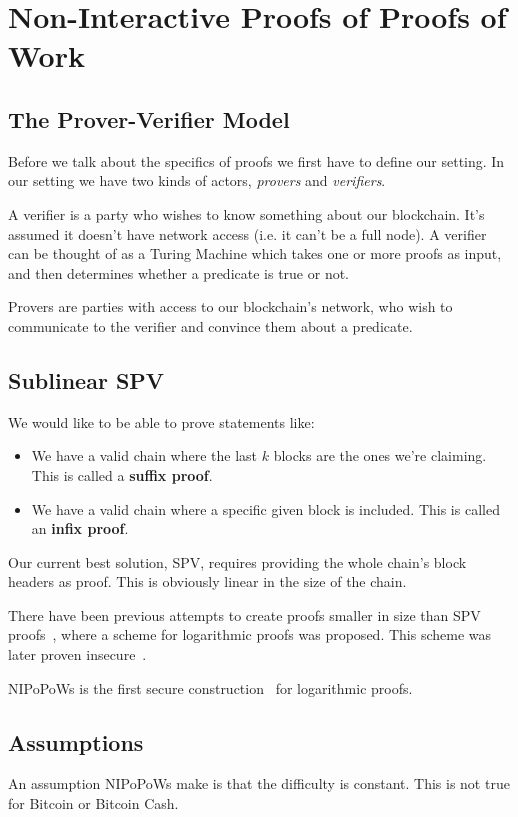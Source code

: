 \section{Non-Interactive Proofs of Proofs of Work}


\subsection{The Prover-Verifier Model}
Before we talk about the specifics of proofs we first have to define our setting. In our setting we have two kinds of actors, \emph{provers} and \emph{verifiers}.

A verifier is a party who wishes to know something about our blockchain. It's assumed it doesn't have network access (i.e. it can't be a full node). A verifier can be thought of as a Turing Machine which takes one or more proofs as input, and then determines whether a predicate is true or not.

Provers are parties with access to our blockchain's network, who wish to communicate to the verifier and convince them about a predicate.

\subsection{Sublinear SPV}
We would like to be able to prove statements like:

\begin{itemize}
  \item We have a valid chain where the last $k$ blocks are the ones we're claiming. This is called a \textbf{suffix proof}.
  \item We have a valid chain where a specific given block is included. This is called an \textbf{infix proof}.
\end{itemize}

Our current best solution, SPV, requires providing the whole chain's block headers as proof. This is obviously linear in the size of the chain.

There have been previous attempts to create proofs smaller in size than SPV proofs~\cite{KLS}, where a scheme for logarithmic proofs was proposed.  This scheme was later proven insecure~\cite{nipopows}.

NIPoPoWs is the first secure construction~\cite{nipopows} for logarithmic proofs.

\subsection{Assumptions}
An assumption NIPoPoWs make is that the difficulty is constant. This is not true for Bitcoin or Bitcoin Cash.

